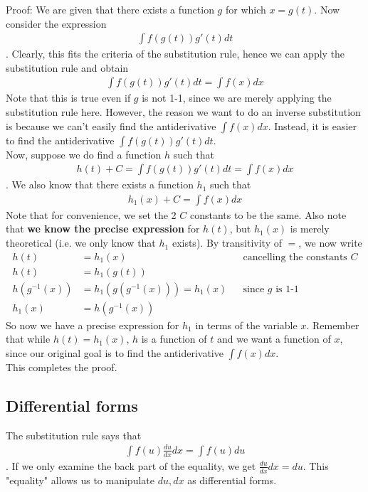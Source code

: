 \documentclass{article}
\begin{document}
Proof:
We are given that there exists a function $g$ for which $x=g(t)$. Now consider the expression
\begin{align*}
    \int f(g(t))g'(t)dt
\end{align*}
. Clearly, this fits the criteria of the substitution rule, hence we can apply the substitution rule and obtain
\begin{align*}
    \int f(g(t))g'(t)dt = \int f(x)dx
\end{align*}
Note that this is true even if $g$ is not 1-1, since we are merely applying the substitution rule here. However, the reason we want to do an inverse substitution is because we can't easily find the antiderivative $\int f(x)dx$. Instead, it is easier to find the antiderivative  $\int f(g(t))g'(t)dt$.\\
Now, suppose we do find a function $h$ such that 
\begin{align*}
    h(t) + C = \int f(g(t))g'(t)dt = \int f(x)dx
\end{align*}
. We also know that there exists a function $h_1$ such that 
\begin{align*}
    h_1(x) + C = \int f(x)dx
\end{align*}
Note that for convenience, we set the 2 $C$ constants to be the same. Also note that \textbf{we know the precise expression} for $h(t)$, but $h_1(x)$ is merely theoretical (i.e. we only know that $h_1$ exists).
By transitivity of $=$, we now write
\begin{align*}
    h(t)&=h_1(x) &&\text{cancelling the constants $C$}\\
    h(t)&=h_1(g(t))\\
    h(g^{-1}(x))&=h_1(g(g^{-1}(x)))=h_1(x) &&\text{since $g$ is 1-1}\\
    h_1(x) &= h(g^{-1}(x))
\end{align*}
So now we have a precise expression for $h_1$ in terms of the variable $x$. Remember that while $h(t)=h_1(x)$, $h$ is a function of $t$ and we want a function of $x$, since our original goal is to find the antiderivative $\int f(x)dx$.\\
This completes the proof.

\subsection{Differential forms}
The substitution rule says that \begin{align*}
    \int f(u)\frac{du}{dx} dx=\int f(u) du
\end{align*}.
If we only examine the back part of the equality, we get $\frac{du}{dx}dx=du$. This "equality" allows us to manipulate $du,dx$ as differential forms.
\end{document}
